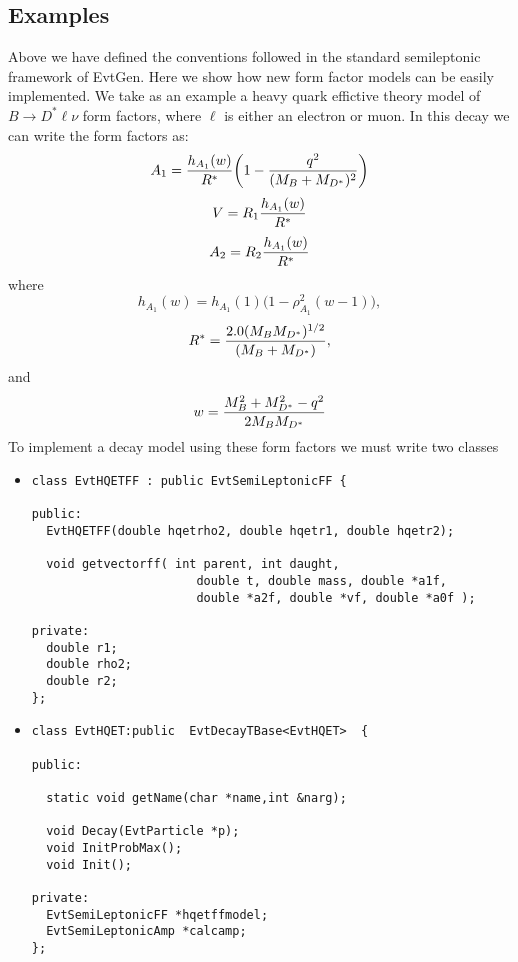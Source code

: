 \subsection{Examples}
\label{sec:examples}
Above we have defined the conventions followed in the standard
semileptonic framework of EvtGen.  Here we show how new
form factor models can be easily implemented.  We take as an
example a heavy quark effictive theory model of 
$B \rightarrow D^* \ell \nu$ form factors, where $\ell$ is
either an electron or muon.  In this decay we can write the
form factors as:
\begin{equation}
A_1 = {{h_{A_1}(w)} \over {R^*}} \biggl ( 1 - { {q^2} \over {(M_B + M_{D^*})^2}}
\biggr )
\end{equation}
\begin{equation}
V = R_1 {{h_{A_1}(w)} \over {R^*}}
\end{equation}
\begin{equation}
A_2 = R_2 {{h_{A_1}(w)} \over {R^*}}
\end{equation}
\noindent where
\begin{equation}
h_{A_1}(w) = h_{A_1}(1) \biggl (1 - \rho_{A_1}^2(w-1) \biggr ),
\end{equation}
\begin{equation}
R^* = { {2.0 (M_B M_{D^*})^{1/2}} \over {(M_B+M_{D^*})}},
\end{equation} 
\noindent and
\begin{equation}
w = { {M_B^2 + M_{D^*}^2 -q^2} \over { 2 M_B M_{D^*}} }
\end{equation}
\noindent To implement a decay model using these form factors
we must write two classes
\begin{itemize} 
\item
\begin{verbatim}
class EvtHQETFF : public EvtSemiLeptonicFF {

public:
  EvtHQETFF(double hqetrho2, double hqetr1, double hqetr2);

  void getvectorff( int parent, int daught,
                       double t, double mass, double *a1f,
                       double *a2f, double *vf, double *a0f );

private:
  double r1;
  double rho2;
  double r2;
};
\end{verbatim}
\item
\begin{verbatim}
class EvtHQET:public  EvtDecayTBase<EvtHQET>  {

public:

  static void getName(char *name,int &narg);

  void Decay(EvtParticle *p);
  void InitProbMax();
  void Init();

private:
  EvtSemiLeptonicFF *hqetffmodel;
  EvtSemiLeptonicAmp *calcamp;
};
\end{verbatim}
\end{itemize}
